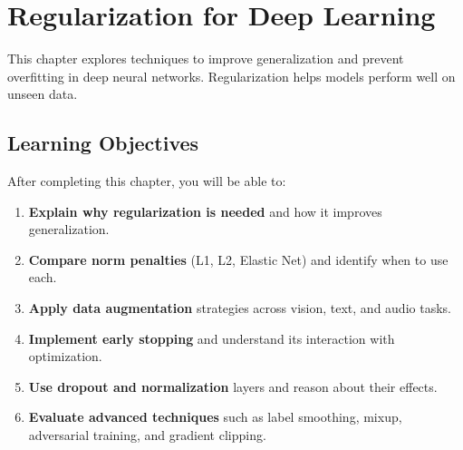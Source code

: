 
\chapter{Regularization for Deep Learning}
\label{chap:regularization}

This chapter explores techniques to improve generalization and prevent overfitting in deep neural networks. Regularization helps models perform well on unseen data.


\section*{Learning Objectives}
\label{sec:ch7-learning-objectives}

After completing this chapter, you will be able to:

\begin{enumerate}
    \item \textbf{Explain why regularization is needed} and how it improves generalization.
    \item \textbf{Compare norm penalties} (L1, L2, Elastic Net) and identify when to use each.
    \item \textbf{Apply data augmentation} strategies across vision, text, and audio tasks.
    \item \textbf{Implement early stopping} and understand its interaction with optimization.
    \item \textbf{Use dropout and normalization} layers and reason about their effects.
    \item \textbf{Evaluate advanced techniques} such as label smoothing, mixup, adversarial training, and gradient clipping.
\end{enumerate}












% 



